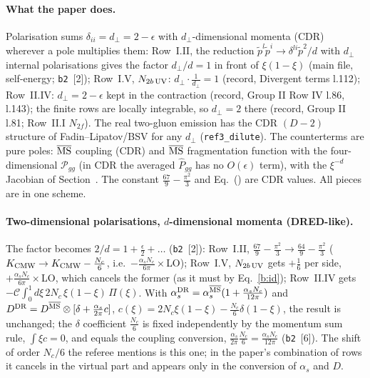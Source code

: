 \paragraph{What the paper does.} Polarisation sums $\delta_{ii}=d_\perp=2-\epsilon$ with $d_\perp$-dimensional momenta (CDR) wherever a pole multiplies them: Row~I.II, the reduction $\tilde p^l\tilde p^i\to\delta^{li}\tilde p^2/d$ with $d_\perp$ internal polarisations gives the factor $d_\perp/d=1$ in front of $\xi(1-\xi)$ (main file, self-energy; \texttt{b2}~[2]); Row~I.V, $N_{2b\,\rm UV}$: $d_\perp\cdot\frac{1}{d_\perp}=1$ (record, Divergent terms l.112); Row~II.IV: $d_\perp=2-\epsilon$ kept in the contraction (record, Group II Row IV l.86, l.143); the finite rows are locally integrable, so $d_\perp=2$ there (record, Group II l.81; Row~II.I $N_{2f}$). The real two-gluon emission has the CDR $(D-2)$ structure of Fadin--Lipatov/BSV for any $d_\perp$ (\texttt{ref3\_dilute}). The counterterms are pure poles: $\overline{\rm MS}$ coupling (CDR) and $\overline{\rm MS}$ fragmentation function with the four-dimensional $\mathcal P_{gg}$ (in CDR the averaged $\hat P_{gg}$ has no $O(\epsilon)$ term), with the $\xi^{-d}$ Jacobian of Section~. The constant $\frac{67}{9}-\frac{\pi^2}{3}$ and Eq.~() are CDR values. All pieces are in one scheme.

\paragraph{Two-dimensional polarisations, $d$-dimensional momenta (DRED-like).} The factor becomes $2/d=1+\frac\epsilon2+\dots$ (\texttt{b2}~[2]): Row~I.II, $\frac{67}{9}-\frac{\pi^2}{3}\to\frac{64}{9}-\frac{\pi^2}{3}$ ($K_{\rm CMW}\to K_{\rm CMW}-\frac{N_c}{6}$, i.e.\ $-\frac{\alpha_sN_c}{6\pi}\times$LO); Row~I.V, $N_{2b\,\rm UV}$ gets $+\frac16$ per side, $+\frac{\alpha_sN_c}{6\pi}\times$LO, which cancels the former (as it must by Eq.~\eqref{b:id}); Row~II.IV gets $-\mathcal C\int_0^1d\xi\,2N_c\,\xi(1-\xi)\,\Pi(\xi)$. With $\alpha_s^{\rm DR}=\alpha_s^{\overline{\rm MS}}(1+\frac{\alpha_sN_c}{12\pi})$ and $D^{\rm DR}=D^{\overline{\rm MS}}\otimes[\delta+\frac{\alpha_s}{2\pi}c]$, $c(\xi)=2N_c\xi(1-\xi)-\frac{N_c}{6}\delta(1-\xi)$, the result is unchanged; the $\delta$ coefficient $\frac{N_c}{6}$ is fixed independently by the momentum sum rule, $\int\xi c=0$, and equals the coupling conversion, $\frac{\alpha_s}{2\pi}\frac{N_c}{6}=\frac{\alpha_sN_c}{12\pi}$ (\texttt{b2}~[6]). The shift of order $N_c/6$ the referee mentions is this one; in the paper's combination of rows it cancels in the virtual part and appears only in the conversion of $\alpha_s$ and $D$.

